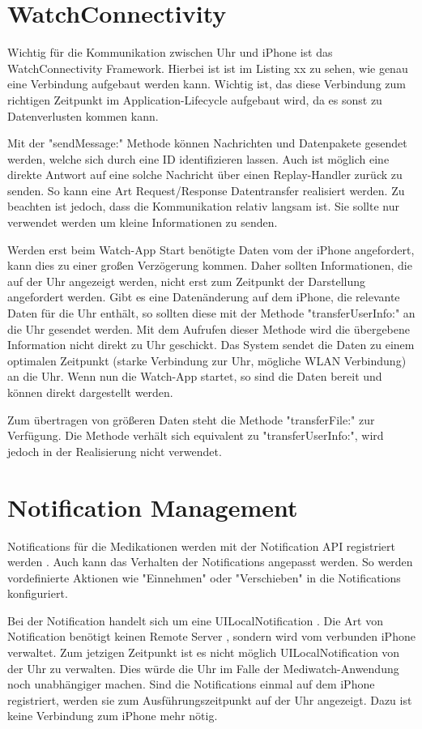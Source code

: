 \section{WatchConnectivity}
Wichtig für die Kommunikation zwischen Uhr und iPhone ist das WatchConnectivity Framework. Hierbei ist ist im Listing xx zu sehen, wie genau eine Verbindung aufgebaut werden kann. Wichtig ist, das diese Verbindung zum richtigen Zeitpunkt im Application-Lifecycle aufgebaut wird, da es sonst zu Datenverlusten kommen kann. 

Mit der "sendMessage:" Methode können Nachrichten und Datenpakete gesendet werden, welche sich durch eine ID identifizieren lassen. Auch ist möglich eine direkte Antwort auf eine solche Nachricht über einen Replay-Handler zurück zu senden. So kann eine Art Request/Response Datentransfer realisiert werden. Zu beachten ist jedoch, dass die Kommunikation relativ langsam ist. Sie sollte nur verwendet werden um kleine Informationen zu senden.

Werden erst beim Watch-App Start benötigte Daten vom der iPhone angefordert, kann dies zu einer großen Verzögerung kommen. Daher sollten Informationen, die auf der Uhr angezeigt werden, nicht erst zum Zeitpunkt der Darstellung angefordert werden. Gibt es eine Datenänderung auf dem iPhone, die relevante Daten für die Uhr enthält, so sollten diese mit der Methode "transferUserInfo:" an die Uhr gesendet werden. Mit dem Aufrufen dieser Methode wird die übergebene Information nicht direkt zu Uhr geschickt. Das System sendet die Daten zu einem optimalen Zeitpunkt (starke Verbindung zur Uhr, mögliche WLAN Verbindung) an die Uhr. Wenn nun die Watch-App startet, so sind die Daten bereit und können direkt dargestellt werden.

Zum übertragen von größeren Daten steht die Methode "transferFile:" zur Verfügung. Die Methode verhält sich equivalent zu "transferUserInfo:", wird jedoch in der Realisierung nicht verwendet.

\section{Notification Management}
Notifications für die Medikationen werden mit der Notification API  registriert werden \cite{Apple:2015notif}. Auch kann das Verhalten der Notifications angepasst werden. So werden vordefinierte Aktionen wie "Einnehmen" oder "Verschieben" in die Notifications konfiguriert.

Bei der Notification handelt sich um eine UILocalNotification \cite{Apple:2015notif}. Die Art von Notification benötigt keinen Remote Server , sondern wird vom verbunden iPhone verwaltet. Zum jetzigen Zeitpunkt ist es nicht möglich UILocalNotification von der Uhr zu verwalten. Dies würde die Uhr im Falle der Mediwatch-Anwendung noch unabhängiger machen. Sind die Notifications einmal auf dem iPhone registriert, werden sie zum Ausführungszeitpunkt auf der Uhr angezeigt. Dazu ist keine Verbindung zum iPhone mehr nötig.

